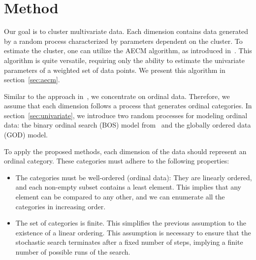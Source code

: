 \section{Method}

Our goal is to cluster multivariate data. Each dimension contains data generated by a random process characterized by parameters dependent on the cluster. To estimate the cluster, one can utilize the AECM algorithm, as introduced in~\citep{meng1997algorithm}. This algorithm is quite versatile, requiring only the ability to estimate the univariate parameters of a weighted set of data points. We present this algorithm in section~\ref{sec:aecm}.

Similar to the approach in~\cite{biernacki2016model}, we concentrate on ordinal data. Therefore, we assume that each dimension follows a process that generates ordinal categories. In section~\ref{sec:univariate}, we introduce two random processes for modeling ordinal data: the binary ordinal search (BOS) model from~\cite{biernacki2016model} and the globally ordered data (GOD) model.

To apply the proposed methods, each dimension of the data should represent an ordinal category. These categories must adhere to the following properties:

\begin{itemize}
\item The categories must be well-ordered (ordinal data): They are linearly ordered, and each non-empty subset contains a least element. This implies that any element can be compared to any other, and we can enumerate all the categories in increasing order.

\item The set of categories is finite. This simplifies the previous assumption to the existence of a linear ordering. This assumption is necessary to ensure that the stochastic search terminates after a fixed number of steps, implying a finite number of possible runs of the search.

\end{itemize}



